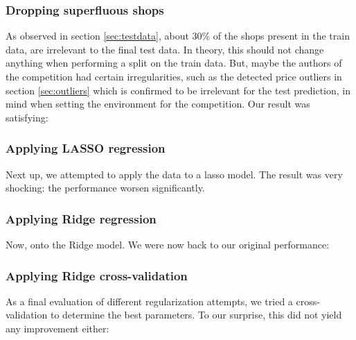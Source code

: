 \subsubsection{Dropping superfluous shops }

As observed in section \ref{sec:testdata}, about 30\% of the shops present in the train data, are irrelevant to the final test data. In theory, this should not change anything when performing a split on the train data. But, maybe the authors of the competition had certain irregularities, such as the detected price outliers in section \ref{sec:outliers} which is confirmed to be irrelevant for the test prediction, in mind when setting the environment for the competition. Our result was satisfying:

\subsubsection{Applying LASSO regression }

Next up, we attempted to apply the data to a \acrshort{lasso} model. The result was very shocking: the performance worsen significantly.

\subsubsection{Applying Ridge regression }

Now, onto the Ridge model. We were now back to our original performance:


\subsubsection{Applying Ridge cross-validation }

As a final evaluation of different regularization attempts, we tried a cross-validation to determine the best parameters. To our surprise, this did not yield any improvement either:


